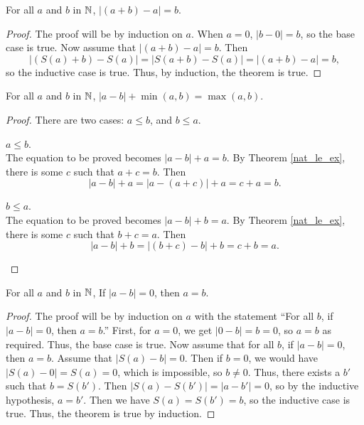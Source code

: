 \documentclass[../../math.tex]{subfiles}
\begin{document}
\begin{theorem}
    For all $a$ and $b$ in $\mathbb{N}$, $|(a + b) - a| = b$.
\end{theorem}
\begin{proof}
    The proof will be by induction on $a$.  When $a = 0$, $|b - 0| = b$, so the
    base case is true.  Now assume that $|(a + b) - a| = b$.  Then
    \[
        |(S(a) + b) - S(a)| = |S(a + b) - S(a)| = |(a + b) - a| = b,
    \]
    so the inductive case is true.  Thus, by induction, the theorem is true.
\end{proof}

\begin{theorem} \label{nat_abs_minus_min}
    For all $a$ and $b$ in $\mathbb{N}$, $|a - b| + \min(a, b) = \max(a, b)$.
\end{theorem}
\begin{proof}
    There are two cases: $a \leq b$, and $b \leq a$.
    \begin{case} $a \leq b$. \\
        The equation to be proved becomes $|a - b| + a = b$.  By Theorem
        \ref{nat_le_ex}, there is some $c$ such that $a + c = b$.  Then
        \[
            |a - b| + a = |a - (a + c)| + a = c + a = b.
        \]
    \end{case}
    \begin{case} $b \leq a$. \\
        The equation to be proved becomes $|a - b| + b = a$.  By Theorem
        \ref{nat_le_ex}, there is some $c$ such that $b + c = a$.  Then
        \[
            |a - b| + b = |(b + c) - b| + b = c + b = a.
        \]
    \end{case}
\end{proof}

\begin{theorem} \label{nat_abs_minus_zero}
    For all $a$ and $b$ in $\mathbb{N}$, If $|a - b| = 0$, then $a = b$.
\end{theorem}
\begin{proof}
    The proof will be by induction on $a$ with the statement ``For all $b$, if
    $|a - b| = 0$, then $a = b$.''  First, for $a = 0$, we get $|0 - b| = b =
    0$, so $a = b$ as required.  Thus, the base case is true.  Now assume that
    for all $b$, if $|a - b| = 0$, then $a = b$.  Assume that $|S(a) - b| = 0$.
    Then if $b = 0$, we would have $|S(a) - 0| = S(a) = 0$, which is impossible,
    so $b \neq 0$.  Thus, there exists a $b'$ such that $b = S(b')$.  Then
    $|S(a) - S(b')| = |a - b'| = 0$, so by the inductive hypothesis, $a = b'$.
    Then we have $S(a) = S(b') = b$, so the inductive case is true.  Thus, the
    theorem is true by induction.
\end{proof}
\end{document}
